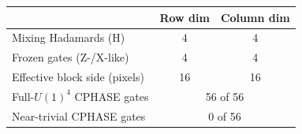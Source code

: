 \begin{tabular}{lcc}
\toprule
 & Row dim & Column dim \\
\midrule
Mixing Hadamards (H) & 4 & 4 \\
Frozen gates (Z-/X-like) & 4 & 4 \\
Effective block side (pixels) & 16 & 16 \\
Full-\(U(1)^4\) CPHASE gates & \multicolumn{2}{c}{56 of 56} \\
Near-trivial CPHASE gates & \multicolumn{2}{c}{0 of 56} \\
\bottomrule
\end{tabular}
